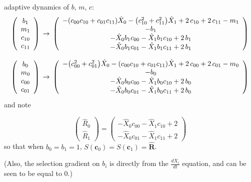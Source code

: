 \documentclass{article}
\begin{document}
adaptive dynamics of $b$, $m$, $c$:
\[\left(\begin{array}{c}
  b_{1}\\
  m_{1}\\
  c_{10}\\
  c_{11}
\end{array}\right)\\
\to\\
\left(\begin{array}{c}
  -{\left(c_{00} c_{10} + c_{01} c_{11}\right)} \hat{X}_{0} - {\left(c_{10}^{2} + c_{11}^{2}\right)} \hat{X}_{1} + 2 \, c_{10} + 2 \, c_{11} - m_{1}\\
  -b_{1}\\
  -\hat{X}_{0} b_{1} c_{00} - \hat{X}_{1} b_{1} c_{10} + 2 \, b_{1}\\
  -\hat{X}_{0} b_{1} c_{01} - \hat{X}_{1} b_{1} c_{11} + 2 \, b_{1}
\end{array}\right)\]

\[\left(\begin{array}{c}
  b_{0}\\
  m_{0}\\
  c_{00}\\
  c_{01}
\end{array}\right)\\
\to\\
\left(\begin{array}{c}
  -{\left(c_{00}^{2} + c_{01}^{2}\right)} \hat{X}_{0} - {\left(c_{00} c_{10} + c_{01} c_{11}\right)} \hat{X}_{1} + 2 \, c_{00} + 2 \, c_{01} - m_{0}\\
  -b_{0}\\
  -\hat{X}_{0} b_{0} c_{00} - \hat{X}_{1} b_{0} c_{10} + 2 \, b_{0}\\
  -\hat{X}_{0} b_{0} c_{01} - \hat{X}_{1} b_{0} c_{11} + 2 \, b_{0}
\end{array}\right)\]
and note

\[
  \left(\begin{array}{c}
  \hat{R}_{0}\\
  \hat{R}_{1}
\end{array}\right) = \left(\begin{array}{c}
  -\hat{X}_{0} c_{00} - \hat{X}_{1} c_{10} + 2\\
  -\hat{X}_{0} c_{01} - \hat{X}_{1} c_{11} + 2
\end{array}\right)
\]
so that when $b_0=b_1=1$, $S(\mathbf{c}_0)=S(\mathbf{c}_1)=\hat{\mathbf{R}}$.

(Also, the selection gradient on $b_i$ is directly from the $\frac{dX_i}{dt}$ equation, and can be seen to be equal to 0.)
\end{document}
